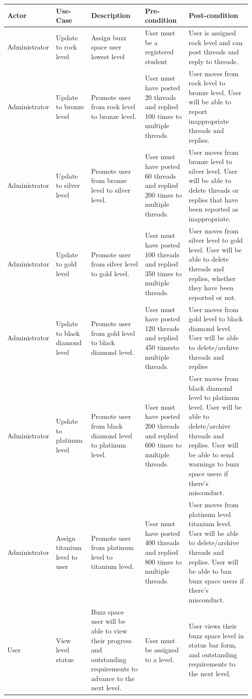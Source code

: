 \documentclass{article}
\begin{document}
\newpage
 \begin{table}
 	\begin{tabular}{p{3cm}p{3cm}p{3cm}p{3cm}p{3cm}}
 		\hline
 		Actor & Use-Case & Description & Pre-condition & Post-condition \\ \hline
 		Administrator & Update to rock level & Assign buzz space user lowest level & User must be a registered student & User is assigned rock level and can post threads and reply to threads.\\ \hline
 		Administrator & Update to bronze level & Promote user from rock level to bronze level. & User must have posted 20 threads and replied 100 times to multiple threads.  & User moves from rock level to bronze level. User will be able to report inappropriate threads and replies.\\ \hline
 		Administrator & Update to silver level & Promote user from bronze level to silver level. & User must have posted 60 threads and replied 200 times to multiple threads. & User moves from bronze level to silver level. User will be able to delete threads or replies that have been reported as inappropriate. \\ \hline
 		Administrator & Update to gold level & Promote user from silver level to gold level. & User must have posted 100 threads and replied 350 times to multiple threads. & User moves from silver level to gold level. User will be able to delete threads and replies, whether they have been reported or not. \\ \hline
 		Administrator & Update to black diamond level & Promote user from gold level to black diamond level. & User must have posted 120 threads and replied 450 timesto multiple threads. & User moves from gold level to black diamond level. User will be able to delete/archive threads and replies  \\ \hline
 		Administrator & Update to platinum level & Promote user from black diamond level to platinum level. & User must have posted 200 threads and replied 600 times to multiple threads. & User moves from black diamond level to platinum level. User will be able to delete/archive threads and replies. User will be able to send warnings to buzz space users if there’s misconduct. \\ \hline  Administrator & Assign titanium level to user & Promote user from platinum level to titanium level. & User must have posted 400 threads and replied 800 times to multiple threads. & User moves from platinum level titanium level. User will be able to delete/archive threads and replies. User will be able to ban buzz space users if there’s misconduct. \\ \hline 
 		User &  View level status & Buzz space user will be able to view their progress and outstanding requirements to advance to the next level. & User must be assigned to a level. & User views their buzz space level in status bar form, and outstanding requirements to the next level. \\ \hline
 	\end{tabular}
 \end{table}
\end{document}

